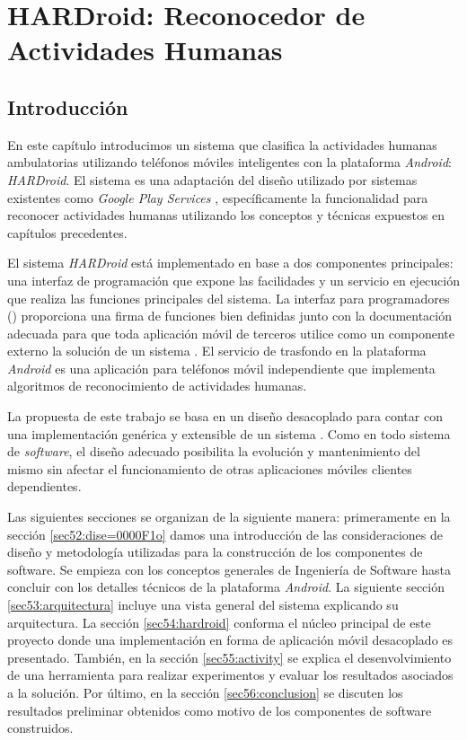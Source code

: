 
\chapter{HARDroid: Reconocedor de Actividades Humanas}

\label{chap5:hardroid}

\section{Introducción}

\label{sec51:intro}En este capítulo introducimos un sistema que clasifica
la actividades humanas ambulatorias utilizando teléfonos móviles inteligentes
con la plataforma \emph{Android}\texttrademark: \emph{HARDroid}.
El sistema es una adaptación del diseño utilizado por sistemas existentes
como \emph{Google Play Services} \cite{Google2013l}, específicamente
la funcionalidad para reconocer actividades humanas utilizando los
conceptos y técnicas expuestos en capítulos precedentes. 

El sistema \emph{HARDroid} está implementado en base a dos componentes
principales: una interfaz de programación que expone las facilidades
y un servicio en ejecución que realiza las funciones principales del
sistema. La interfaz para programadores () proporciona
una firma de funciones bien definidas junto con la documentación adecuada
para que toda aplicación móvil de terceros utilice como un componente
externo la solución de un sistema . El servicio de trasfondo
en la plataforma \emph{Android\texttrademark} es una aplicación para
teléfonos móvil independiente que implementa algoritmos de reconocimiento
de actividades humanas.

La propuesta de este trabajo se basa en un diseño desacoplado para
contar con una implementación genérica y extensible de un sistema
. Como en todo sistema de \emph{software}, el diseño adecuado
posibilita la evolución y mantenimiento del mismo sin afectar el funcionamiento
de otras aplicaciones móviles clientes dependientes. 

Las siguientes secciones se organizan de la siguiente manera: primeramente
en la sección \ref{sec52:dise=0000F1o} damos una introducción de
las consideraciones de diseño y metodología utilizadas para la construcción
de los componentes de software. Se empieza con los conceptos generales
de Ingeniería de Software hasta concluir con los detalles técnicos
de la plataforma \emph{Android}. La siguiente sección \ref{sec53:arquitectura}
incluye una vista general del sistema explicando su arquitectura.
La sección \ref{sec54:hardroid} conforma el núcleo principal de este
proyecto donde una implementación  en forma de aplicación
móvil desacoplado es presentado. También, en la sección \ref{sec55:activity}
se explica el desenvolvimiento de una herramienta para realizar experimentos
y evaluar los resultados asociados a la solución. Por último, en la
sección \ref{sec56:conclusion} se discuten los resultados preliminar
obtenidos como motivo de los componentes de software construidos.

